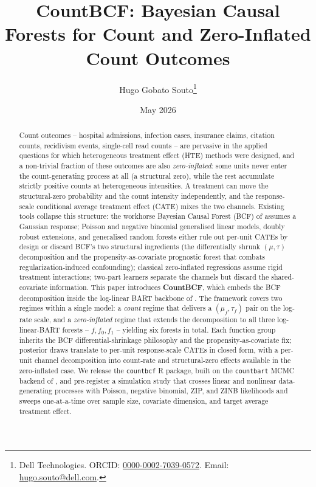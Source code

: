 \documentclass[11pt]{article}
\title{CountBCF: Bayesian Causal Forests for Count and
       Zero-Inflated Count Outcomes}
\author{Hugo Gobato Souto\thanks{Dell Technologies. ORCID: \href{https://orcid.org/0000-0002-7039-0572}{0000-0002-7039-0572}.
Email: \href{mailto:hugo.souto@dell.com}{hugo.souto@dell.com}.}}
\date{May 2026}
\theoremstyle{plain}
\theoremstyle{definition}
\theoremstyle{remark}
\newcommand{\muF}{\mu_f}
\newcommand{\tauF}{\tau_f}
\newcommand{\fzeroSym}{f_{0}}
\newcommand{\foneSym}{f_{1}}
\begin{document}
\maketitle

\begin{abstract}
\noindent
Count outcomes -- hospital admissions, infection cases, insurance
claims, citation counts, recidivism events, single-cell read counts --
are pervasive in the applied questions for which heterogeneous
treatment effect (HTE) methods were designed, and a non-trivial
fraction of these outcomes are also \emph{zero-inflated}: some units
never enter the count-generating process at all (a structural zero),
while the rest accumulate strictly positive counts at heterogeneous
intensities. A treatment can move the structural-zero probability and
the count intensity independently, and the response-scale conditional
average treatment effect (CATE) mixes the two channels. Existing
tools collapse this structure: the workhorse Bayesian Causal Forest
(BCF) of \citet{hahn2020bayesian} assumes a Gaussian response;
Poisson and negative binomial generalised linear models, doubly robust
extensions, and generalised random forests either rule out per-unit
CATEs by design or discard BCF's two structural ingredients (the
differentially shrunk $(\mu, \tau)$ decomposition and the
propensity-as-covariate prognostic forest that combats
regularization-induced confounding); classical zero-inflated
regressions assume rigid treatment interactions; two-part learners
separate the channels but discard the shared-covariate information.
This paper introduces \textbf{CountBCF}, which embeds the BCF
decomposition inside the log-linear BART backbone of
\citet{murray2021loglinear}. The framework covers two regimes within a
single model: a \emph{count} regime that delivers a $(\muF, \tauF)$
pair on the log-rate scale, and a \emph{zero-inflated} regime that
extends the decomposition to all three log-linear-BART forests --
$f, \fzeroSym, \foneSym$ -- yielding six forests in total. Each
function group inherits the BCF differential-shrinkage philosophy and
the propensity-as-covariate fix; posterior draws translate to per-unit
response-scale CATEs in closed form, with a per-unit channel
decomposition into count-rate and structural-zero effects available
in the zero-inflated case. We release the \texttt{countbcf} R package,
built on the \texttt{countbart} MCMC backend of
\citet{wikle2023causal}, and pre-register a simulation study that
crosses linear and nonlinear data-generating processes with Poisson,
negative binomial, ZIP, and ZINB likelihoods and sweeps one-at-a-time
over sample size, covariate dimension, and target average treatment
effect.
\end{abstract}
\end{document}
